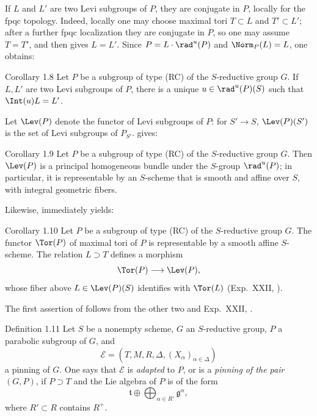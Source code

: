 If \(L\) and \(L'\) are two Levi subgroups of \(P\), they are conjugate in
\(P\), locally for the fpqc topology.  Indeed, locally one may choose
maximal tori \(T\subset L\) and \(T'\subset L'\); after a further fpqc
localization they are conjugate in \(P\), so one may assume \(T=T'\), and
then  gives \(L=L'\).  Since
\(P=L\cdot\rad^u(P)\) and \(\Norm_P(L)=L\), one obtains:

\begin{sgastatement}{Corollary 1.8}
Let \(P\) be a subgroup of type \textup{(RC)} of the \(S\)-reductive group
\(G\).  If \(L,L'\) are two Levi subgroups of \(P\), there is a unique
\(u\in\rad^u(P)(S)\) such that \(\Int(u)L=L'\).
\end{sgastatement}

Let \(\Lev(P)\) denote the functor of Levi subgroups of \(P\): for
\(S'\to S\), \(\Lev(P)(S')\) is the set of Levi subgroups of \(P_{S'}\).
 gives:

\begin{sgastatement}{Corollary 1.9}
Let \(P\) be a subgroup of type \textup{(RC)} of the \(S\)-reductive group
\(G\).  Then \(\Lev(P)\) is a principal homogeneous bundle under the
\(S\)-group \(\rad^u(P)\); in particular, it is representable by an
\(S\)-scheme that is smooth and affine over \(S\), with integral geometric
fibers.
\end{sgastatement}

Likewise,  immediately yields:

\begin{sgastatement}{Corollary 1.10}
Let \(P\) be a subgroup of type \textup{(RC)} of the \(S\)-reductive group
\(G\).  The functor \(\Tor(P)\) of maximal tori of \(P\) is representable
by a smooth affine \(S\)-scheme.  The relation \(L\supset T\) defines a
morphism
\[
 \Tor(P)\longrightarrow\Lev(P),
\]
whose fiber above \(L\in\Lev(P)(S)\) identifies with \(\Tor(L)\)
\textup{(Exp.\ XXII, )}.
\end{sgastatement}

The first assertion of  follows from the other two and Exp.\ XXII,
.

\begin{sgastatement}{Definition 1.11}
Let \(S\) be a nonempty scheme, \(G\) an \(S\)-reductive group, \(P\) a
parabolic subgroup of \(G\), and
\[
 \mathcal E=(T,M,R,\Delta,(X_\alpha)_{\alpha\in\Delta})
\]
a pinning of \(G\).  One says that \(\mathcal E\) is \emph{adapted} to
\(P\), or is a \emph{pinning of the pair \((G,P)\)}, if \(P\supset T\) and
the Lie algebra of \(P\) is of the form
\[
 \mathfrak t\oplus\bigoplus_{\alpha\in R'}\mathfrak g^\alpha,
\]
where \(R'\subset R\) contains \(R^+\).
\end{sgastatement}

